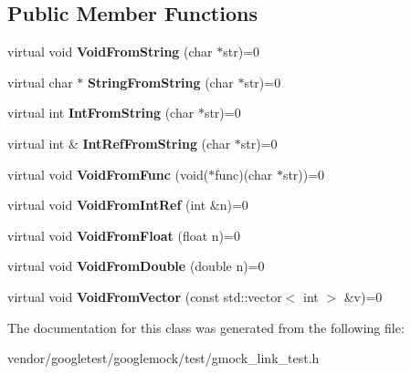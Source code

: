 \subsection*{Public Member Functions}
\begin{DoxyCompactItemize}
\item 
virtual void {\bfseries Void\+From\+String} (char $\ast$str)=0\hypertarget{classInterface_a65d6ae604e7e9a513aec72c9c94e0b97}{}\label{classInterface_a65d6ae604e7e9a513aec72c9c94e0b97}

\item 
virtual char $\ast$ {\bfseries String\+From\+String} (char $\ast$str)=0\hypertarget{classInterface_a756b1d22c12aa3f14a5083f90043fbf0}{}\label{classInterface_a756b1d22c12aa3f14a5083f90043fbf0}

\item 
virtual int {\bfseries Int\+From\+String} (char $\ast$str)=0\hypertarget{classInterface_ab34c8a5fd2236a6b009f86a4e5851b61}{}\label{classInterface_ab34c8a5fd2236a6b009f86a4e5851b61}

\item 
virtual int \& {\bfseries Int\+Ref\+From\+String} (char $\ast$str)=0\hypertarget{classInterface_ab93276de67e60c44fd775d4c139aa8e1}{}\label{classInterface_ab93276de67e60c44fd775d4c139aa8e1}

\item 
virtual void {\bfseries Void\+From\+Func} (void($\ast$func)(char $\ast$str))=0\hypertarget{classInterface_a7dab3c82b857a9a5f52b3ce6f7df547f}{}\label{classInterface_a7dab3c82b857a9a5f52b3ce6f7df547f}

\item 
virtual void {\bfseries Void\+From\+Int\+Ref} (int \&n)=0\hypertarget{classInterface_aa43fb56650a57b6b3e7743e54e50cb86}{}\label{classInterface_aa43fb56650a57b6b3e7743e54e50cb86}

\item 
virtual void {\bfseries Void\+From\+Float} (float n)=0\hypertarget{classInterface_ae2b3e9411c893a45642d3af632752c66}{}\label{classInterface_ae2b3e9411c893a45642d3af632752c66}

\item 
virtual void {\bfseries Void\+From\+Double} (double n)=0\hypertarget{classInterface_aa56524017aabdbe46510648c711ab8a8}{}\label{classInterface_aa56524017aabdbe46510648c711ab8a8}

\item 
virtual void {\bfseries Void\+From\+Vector} (const std\+::vector$<$ int $>$ \&v)=0\hypertarget{classInterface_ae84fe7e53f881db2f823ad35d004927a}{}\label{classInterface_ae84fe7e53f881db2f823ad35d004927a}

\end{DoxyCompactItemize}


The documentation for this class was generated from the following file\+:\begin{DoxyCompactItemize}
\item 
vendor/googletest/googlemock/test/gmock\+\_\+link\+\_\+test.\+h\end{DoxyCompactItemize}

